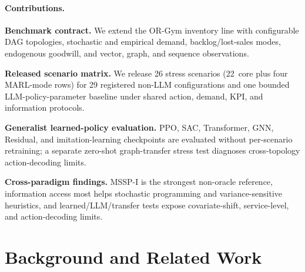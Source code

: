 \documentclass[10pt,a4paper]{article}
\let\origenumerate\enumerate
\let\endorigenumerate\endenumerate
\renewenvironment{enumerate}[1][]{\origenumerate}{\endorigenumerate}
\begin{document}
\paragraph{Contributions.}
\begin{enumerate}[leftmargin=*,itemsep=0pt,topsep=1pt]
  \item \textbf{Benchmark contract.}
        We extend the OR-Gym inventory line with configurable DAG topologies,
        stochastic and empirical demand, backlog/lost-sales modes, endogenous
        goodwill, and vector, graph, and sequence observations.

  \item \textbf{Released scenario matrix.}
        We release 26 stress scenarios (22~core plus four MARL-mode rows)
        for 29 registered non-LLM configurations and one bounded
        LLM-policy-parameter baseline under shared action, demand, KPI, and
        information protocols.

  \item \textbf{Generalist learned-policy evaluation.}
        PPO, SAC, Transformer, GNN, Residual, and imitation-learning
        checkpoints are evaluated without per-scenario retraining; a separate
        zero-shot graph-transfer stress test diagnoses cross-topology
        action-decoding limits.

  \item \textbf{Cross-paradigm findings.}
        MSSP-I is the strongest non-oracle reference, information access most
        helps stochastic programming and variance-sensitive heuristics, and
        learned/LLM/transfer tests expose covariate-shift, service-level, and
        action-decoding limits.
\end{enumerate}

\section{Background and Related Work}\label{sec:background}
\end{document}
